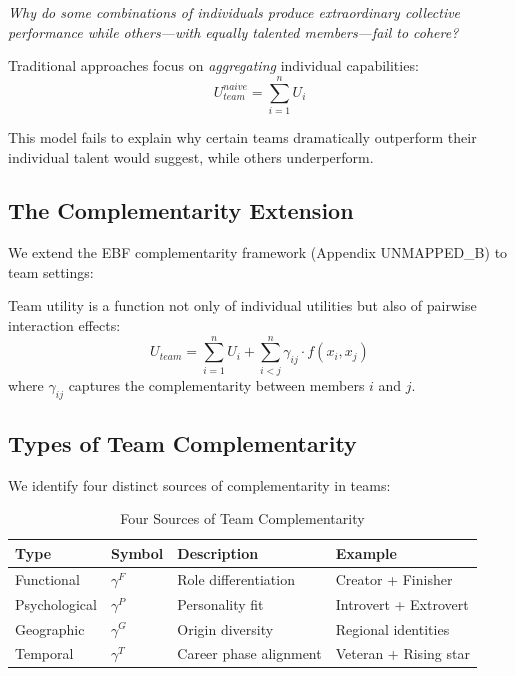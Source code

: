 \begin{tcolorbox}[colback=yellow!10!white, colframe=yellow!50!black, title=Fundamental Question]
\textit{Why do some combinations of individuals produce extraordinary collective
performance while others—with equally talented members—fail to cohere?}
\end{tcolorbox}

Traditional approaches focus on \textit{aggregating} individual capabilities:
\begin{equation}
U_{team}^{naive} = \sum_{i=1}^{n} U_i
\end{equation}

This model fails to explain why certain teams dramatically outperform their
individual talent would suggest, while others underperform.

\subsection{The Complementarity Extension}

We extend the EBF complementarity framework (Appendix UNMAPPED_B) to team settings:

\begin{axiom}
\label{ax:team-comp}
Team utility is a function not only of individual utilities but also of
pairwise interaction effects:
\begin{equation}
U_{team} = \sum_{i=1}^{n} U_i + \sum_{i<j}^{n} \gamma_{ij} \cdot f(x_i, x_j)
\end{equation}
where $\gamma_{ij}$ captures the complementarity between members $i$ and $j$.
\end{axiom}

\subsection{Types of Team Complementarity}

We identify four distinct sources of complementarity in teams:

\begin{table}[h]
\centering
\caption{Four Sources of Team Complementarity}
\label{tab:comp-sources}
\begin{tabular}{llll}
\toprule
\textbf{Type} & \textbf{Symbol} & \textbf{Description} & \textbf{Example} \\
\midrule
Functional & $\gamma^{F}$ & Role differentiation & Creator + Finisher \\
Psychological & $\gamma^{P}$ & Personality fit & Introvert + Extrovert \\
Geographic & $\gamma^{G}$ & Origin diversity & Regional identities \\
Temporal & $\gamma^{T}$ & Career phase alignment & Veteran + Rising star \\
\bottomrule
\end{tabular}
\end{table}

